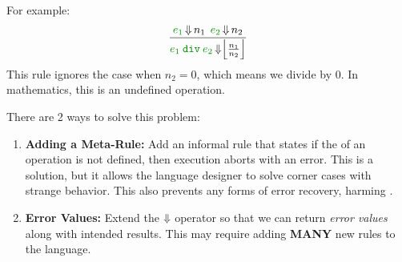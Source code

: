 For example:
\begin{equation}\label{eq:Incomplete_Semantic_Rule}
  \frac{\SemanticInput{e_{1}} \EvaluatesTo n_{1} \:\: \SemanticInput{e_{2}} \EvaluatesTo n_{2}}{\SemanticInput{e_{1}} \: \SemanticInput{\mathtt{div}}\: \SemanticInput{e_{2}} \EvaluatesTo \Bigl\lfloor \frac{n_{1}}{n_{2}} \Bigr\rfloor}
\end{equation}
This rule ignores the case when $n_{2} = 0$, which means we divide by 0.
In mathematics, this is an undefined operation.

There are 2 ways to solve this problem:
\begin{enumerate}[noitemsep]
\item \textbf{Adding a Meta-Rule:} Add an informal rule that states if the  of an operation is not defined, then execution aborts with an error.
  This is a solution, but it allows the language designer to solve corner cases with strange behavior.
  This also prevents any forms of error recovery, harming .
\item \textbf{Error Values:} Extend the $\operatorname{\Downarrow}$  operator so that we can return \emph{error values} along with intended results.
  This may require adding \textbf{MANY} new rules to the language.
\end{enumerate}

